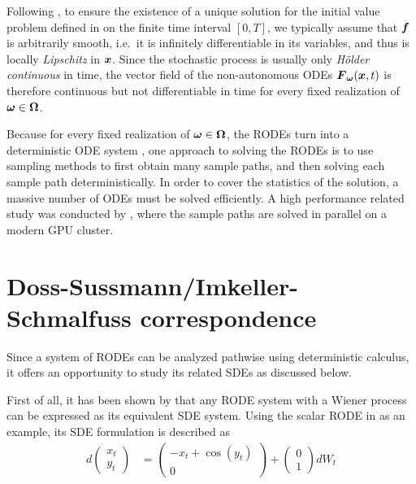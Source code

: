 Following \cite{kloeden2007pathwise}, to ensure the existence of a unique solution for the initial value problem defined in  on the finite time interval $[0,T]$, we typically assume that $\boldsymbol{f}$ is arbitrarily smooth, i.e.\ it is infinitely differentiable in its variables, and thus is locally \emph{Lipschitz} in $\boldsymbol{x}$. 
Since the stochastic process is usually only \emph{H{\"o}lder continuous} in time, the vector field of the non-autonomous ODEs $\boldsymbol{F}_{\boldsymbol{\omega}}(\boldsymbol{x}, t)$ is therefore continuous but not differentiable in time for every fixed realization of $\boldsymbol{\omega} \in \boldsymbol{\Omega}$.

Because for every fixed realization of $\boldsymbol{\omega} \in \boldsymbol{\Omega}$, the RODEs  turn into a deterministic ODE system , one approach to solving the RODEs is to use sampling methods to first obtain many sample paths, and then solving each sample path deterministically.
In order to cover the statistics of the solution, a massive number of ODEs must be solved efficiently.
A high performance related study was conducted by \cite{riesinger2016solving}, where the sample paths are solved in parallel on a modern GPU cluster.

\section{Doss-Sussmann/Imkeller-Schmalfuss correspondence}
\label{sec-doss-sussmann}

Since a system of RODEs can be analyzed pathwise using deterministic calculus, it offers an opportunity to study its related SDEs as discussed below.

First of all, it has been shown by \cite{jentzen2011taylor} that any RODE system with a Wiener process can be expressed as its equivalent SDE system. 
Using the scalar RODE in  as an example, its SDE formulation is described as
\begin{align}
    d\begin{pmatrix}
        x_t 
        \\ 
        y_t
    \end{pmatrix}
    & = 
    \begin{pmatrix}
        -x_t + \cos{(y_t)}
        \\
        0
    \end{pmatrix}
    + 
    \begin{pmatrix}
        0
        \\
        1
    \end{pmatrix}
    dW_t
\end{align}

